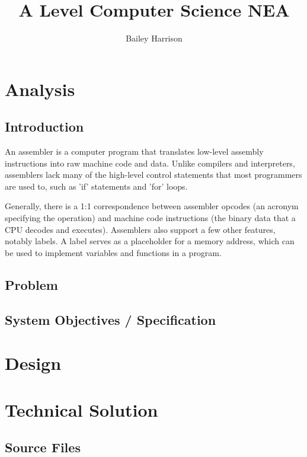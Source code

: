 \documentclass[a4paper]{report}
\title{A Level Computer Science NEA}
\author{Bailey Harrison}
\begin{document}
\maketitle

\tableofcontents



\chapter{Analysis}

\section{Introduction}

An assembler is a computer program that translates low-level assembly instructions
into raw machine code and data. Unlike compilers and interpreters, assemblers lack
many of the high-level control statements that most programmers are used to, such
as 'if' statements and 'for' loops.

Generally, there is a 1:1 correspondence between assembler opcodes (an acronym
specifying the operation) and machine code instructions (the binary data that a CPU
decodes and executes). Assemblers also support a few other features, notably labels.
A label serves as a placeholder for a memory address, which can be used to implement
variables and functions in a program.

\section{Problem}

\section{System Objectives / Specification}



\chapter{Design}



\chapter{Technical Solution}

\section{Source Files}
\end{document}
